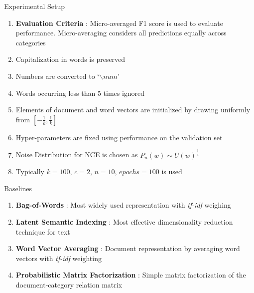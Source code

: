 \documentclass[10pt]{beamer}
\begin{document}
\begin{frame}{Experimental Setup}
\begin{enumerate}
	\vfill\item<1-> \textbf{Evaluation Criteria} : Micro-averaged F1 score is used to evaluate performance. Micro-averaging considers all predictions equally across categories
	\vfill\item<2-> Capitalization in words is preserved
	\vfill\item<3-> Numbers are converted to `$\backslash num$'
	\vfill\item<4-> Words occurring less than $5$ times ignored
	\vfill\item<5-> Elements of document and word vectors are initialized by drawing uniformly from $[-\frac{1}{k}, \frac{1}{k}]$ 
	\vfill\item<6-> Hyper-parameters are fixed using performance on the validation set
	\vfill\item<7-> Noise Distribution for NCE is chosen as $P_{n}(w) \sim U(w)^{\frac{3}{4}}$
	\vfill\item<8-> Typically $k=100$, $c=2$, $n=10$, $epochs=100$ is used
\end{enumerate}
\end{frame}

\begin{frame}{Baselines}
\begin{enumerate}
	\vfill\item<1-> \textbf{Bag-of-Words} : Most widely used representation with \emph{tf-idf} weighing
	\vfill\item<2-> \textbf{Latent Semantic Indexing} : Most effective dimensionality reduction technique for text
	\vfill\item<3-> \textbf{Word Vector Averaging} : Document representation by averaging word vectors with \emph{tf-idf} weighting
	\vfill\item<4-> \textbf{Probabilistic Matrix Factorization} : Simple matrix factorization of the document-category relation matrix
\end{enumerate}
\end{frame}
\end{document}
